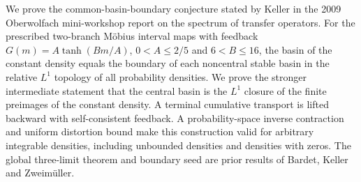 
We prove the common-basin-boundary conjecture stated by Keller in the 2009
Oberwolfach mini-workshop report on the spectrum of transfer operators. For the prescribed
two-branch M\"obius interval maps with feedback
$G(m)=A\tanh(Bm/A)$, $0<A\le2/5$ and $6<B\le16$, the basin of the constant
density equals the boundary of each noncentral stable basin in the relative
$L^1$ topology of all probability densities. We prove the stronger intermediate
statement that the central basin is the $L^1$ closure of the finite preimages
of the constant density. A terminal cumulative transport is lifted backward
with self-consistent feedback. A probability-space inverse contraction and
uniform distortion bound make this construction valid for arbitrary
integrable densities, including unbounded densities and densities with zeros.
The global three-limit theorem and boundary seed are prior results of
Bardet, Keller and Zweim\"uller.
